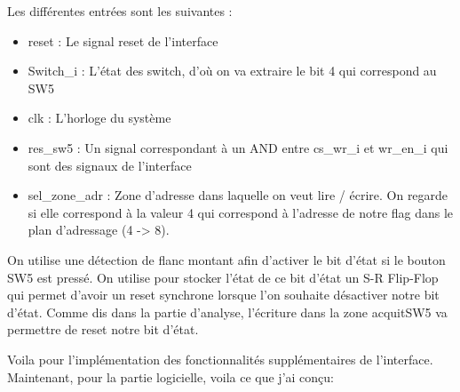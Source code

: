 \par
Les différentes entrées sont les suivantes : 
\begin{itemize}
\item reset : Le signal reset de l'interface
\item Switch\_i : L'état des switch, d'où on va extraire le bit 4 qui correspond au SW5
\item clk : L'horloge du système
\item res\_sw5 : Un signal correspondant à un AND entre cs\_wr\_i et wr\_en\_i qui sont des signaux de l'interface
\item sel\_zone\_adr : Zone d'adresse dans laquelle on veut lire / écrire. On regarde si elle correspond à la valeur 4 qui correspond à l'adresse de notre flag dans le plan d'adressage (4 -> 8).\\
\end{itemize}
\par
On utilise une détection de flanc montant afin d'activer le bit d'état si le bouton SW5 est pressé. On utilise pour stocker l'état de ce bit d'état un S-R Flip-Flop qui permet d'avoir un reset synchrone lorsque l'on souhaite désactiver notre bit d'état. Comme dis dans la partie d'analyse, l'écriture dans la zone acquitSW5 va permettre de reset notre bit d'état. \\
\par
Voila pour l'implémentation des fonctionnalités supplémentaires de l'interface. Maintenant, pour la partie logicielle, voila ce que j'ai conçu: \\

